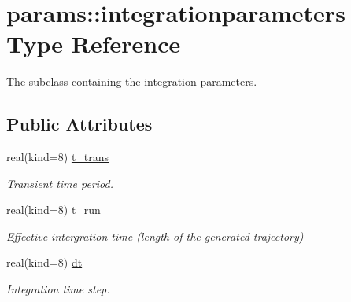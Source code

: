 \hypertarget{structparams_1_1integrationparameters}{}\section{params\+:\+:integrationparameters Type Reference}
\label{structparams_1_1integrationparameters}


The subclass containing the integration parameters.  


\subsection*{Public Attributes}
\begin{DoxyCompactItemize}
\item 
\mbox{\label{structparams_1_1integrationparameters_a73a172332bf1bcd0cf80563956500dde}} 
real(kind=8) \hyperlink{structparams_1_1integrationparameters_a73a172332bf1bcd0cf80563956500dde}{t\+\_\+trans}
\begin{DoxyCompactList}\small\item\em Transient time period. \end{DoxyCompactList}\item 
\mbox{\label{structparams_1_1integrationparameters_a85f473fb6ea786e419dd376d4f8980fd}} 
real(kind=8) \hyperlink{structparams_1_1integrationparameters_a85f473fb6ea786e419dd376d4f8980fd}{t\+\_\+run}
\begin{DoxyCompactList}\small\item\em Effective intergration time (length of the generated trajectory) \end{DoxyCompactList}\item 
\mbox{\label{structparams_1_1integrationparameters_aabc133bb728aff702de1f9ec824d4b41}} 
real(kind=8) \hyperlink{structparams_1_1integrationparameters_aabc133bb728aff702de1f9ec824d4b41}{dt}
\begin{DoxyCompactList}\small\item\em Integration time step. \end{DoxyCompactList}\item 
\mbox{\label{structparams_1_1integrationparameters_a33a3ac774f065b62c2aa2e44da39537a}} 

\end{DoxyCompactItemize}
